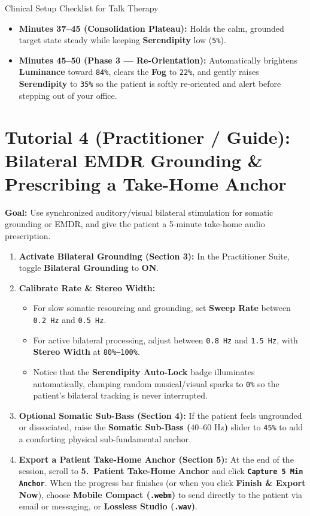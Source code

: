 \documentclass[11pt,oneside,openany]{book}
\begin{document}
\begin{clinicalbox}{Clinical Setup Checklist for Talk Therapy}
\begin{enumerate}
\begin{itemize}
      \item \textbf{Minutes 37--45 (Consolidation Plateau):} Holds the calm, grounded target state steady while keeping \textbf{Serendipity} low (\texttt{5\%}).
      \item \textbf{Minutes 45--50 (Phase 3 --- Re-Orientation):} Automatically brightens \textbf{Luminance} toward \texttt{84\%}, clears the \textbf{Fog} to \texttt{22\%}, and gently raises \textbf{Serendipity} to \texttt{35\%} so the patient is softly re-oriented and alert before stepping out of your office.
    \end{itemize}
\end{enumerate}
\end{clinicalbox}

\section{Tutorial 4 (Practitioner / Guide): Bilateral EMDR Grounding \& Prescribing a Take-Home Anchor}

\textbf{Goal:} Use synchronized auditory/visual bilateral stimulation for somatic grounding or EMDR, and give the patient a 5-minute take-home audio prescription.

\begin{enumerate}
  \item \textbf{Activate Bilateral Grounding (Section 3):} In the Practitioner Suite, toggle \textbf{Bilateral Grounding} to \textbf{ON}.
  \item \textbf{Calibrate Rate \& Stereo Width:}
    \begin{itemize}
      \item For slow somatic resourcing and grounding, set \textbf{Sweep Rate} between \texttt{0.2 Hz} and \texttt{0.5 Hz}.
      \item For active bilateral processing, adjust between \texttt{0.8 Hz} and \texttt{1.5 Hz}, with \textbf{Stereo Width} at \texttt{80\%--100\%}.
      \item Notice that the \textbf{Serendipity Auto-Lock} badge illuminates automatically, clamping random musical/visual sparks to \texttt{0\%} so the patient's bilateral tracking is never interrupted.
    \end{itemize}
  \item \textbf{Optional Somatic Sub-Bass (Section 4):} If the patient feels ungrounded or dissociated, raise the \textbf{Somatic Sub-Bass ($40\text{--}60\text{ Hz}$)} slider to \texttt{45\%} to add a comforting physical sub-fundamental anchor.
  \item \textbf{Export a Patient Take-Home Anchor (Section 5):} At the end of the session, scroll to \textbf{5.\ Patient Take-Home Anchor} and click \textbf{\texttt{Capture 5 Min Anchor}}. When the progress bar finishes (or when you click \textbf{Finish \& Export Now}), choose \textbf{Mobile Compact (\texttt{.webm})} to send directly to the patient via email or messaging, or \textbf{Lossless Studio (\texttt{.wav})}.
\end{enumerate}
\end{document}
